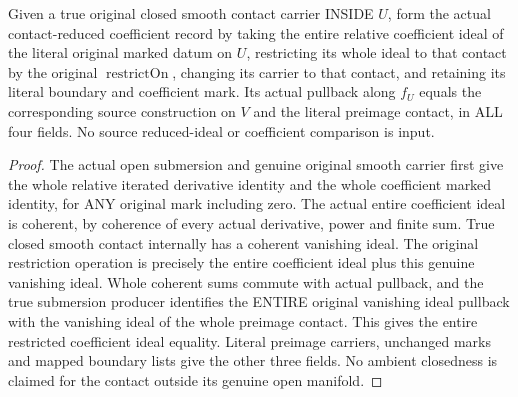 \begin{theorem}
\label{hir:submersion-contact-restriction-whole-reduced-record}
\leanok
Given a true original closed smooth contact carrier INSIDE $U$, form the
actual contact-reduced coefficient record by taking the entire relative
coefficient ideal of the literal original marked datum on $U$, restricting
its whole ideal to that contact by the original $\operatorname{restrictOn}$,
changing its carrier to that contact, and retaining its literal boundary and
coefficient mark. Its actual pullback along $f_U$ equals the corresponding
source construction on $V$ and the literal preimage contact, in ALL four
fields. No source reduced-ideal or coefficient comparison is input.
\end{theorem}
\begin{proof}
The actual open submersion and genuine original smooth carrier first give
the whole relative iterated derivative identity and the whole coefficient
marked identity, for ANY original mark including zero. The actual entire
coefficient ideal is coherent, by coherence of every actual derivative,
power and finite sum. True closed smooth contact internally has a coherent
vanishing ideal. The original restriction operation is precisely the entire
coefficient ideal plus this genuine vanishing ideal. Whole coherent sums
commute with actual pullback, and the true submersion producer identifies
the ENTIRE original vanishing ideal pullback with the vanishing ideal of
the whole preimage contact. This gives the entire restricted coefficient
ideal equality. Literal preimage carriers, unchanged marks and mapped
boundary lists give the other three fields. No ambient closedness is
claimed for the contact outside its genuine open manifold.
\end{proof}

